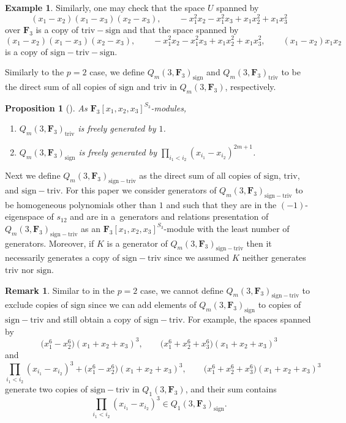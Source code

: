 \documentclass[11pt]{article}
\numberwithin{equation}{section}
\newtheorem{Proposition}[Theorem]{Proposition}
\theoremstyle{definition}
\newtheorem{Example}[Theorem]{Example}
\newtheorem{Remark}[Theorem]{Remark}
\numberwithin{equation}{section}
\newcommand{\F}{\mathbf{F}}
\newcommand{\sgn}{\mathrm{sign}}
\newcommand{\triv}{\mathrm{triv}}
\newcommand{\sign}{\mathrm{sign}}
\newcommand{\six}{\mathrm{sign-triv-sign}}
\newcommand{\siv}{\mathrm{sign-triv}}
\newcommand{\tign}{\mathrm{triv-sign}}
\begin{document}
\begin{Example}
 Similarly, one may check that the space $U$ spanned by
 \[(x_1-x_2)(x_1-x_3)(x_2-x_3),\qquad-x_1^2x_2-x_1^2x_3+x_1x_2^2+x_1x_3^2\]
 over $\mathbf{F}_3$ is a copy of $\tign$ and that the space spanned by
 \[(x_1-x_2)(x_1-x_3)(x_2-x_3),\qquad-x_1^2x_2-x_1^2x_3+x_1x_2^2+x_1x_3^2,\qquad(x_1-x_2)x_1x_2\]
 is a copy of $\six$.
\end{Example}

Similarly to the $p=2$ case, we define $Q_m(3,\mathbf{F}_3)_{\sign}$ and $Q_m(3,\mathbf{F}_3)_{\triv}$ to be the direct sum of all copies of $\sign$ and $\triv$ in $Q_m(3,\mathbf{F}_3)$, respectively.
\begin{Proposition}[\cite{wang2022explicit}]\label{prop:trivsign}
 As $\mathbf{F}_3[x_1,x_2,x_3]^{S_3}$-modules,
 \begin{enumerate}\itemsep=0pt
 \item[$1$.] $Q_m(3,\mathbf{F}_3)_\triv$ is freely generated by $1$.
 \item[$2$.] $Q_m(3,\mathbf{F}_3)_\sgn$ is freely generated by $\prod_{i_1<i_2}(x_{i_1}-x_{i_2})^{2m+1}$.
 \end{enumerate}
\end{Proposition}

Next we define $Q_m(3,\mathbf{F}_3)_{\siv}$ as the direct sum of all copies of $\sign$, $\triv$, and $\siv$. For this paper we consider generators of $Q_m(3,\mathbf{F}_3)_{\siv}$ to be homogeneous polynomials other than $1$ and  such that they are in the $(-1)$-eigenspace of $s_{12}$ and are in a~generators and relations presentation of $Q_m(3,\mathbf{F}_3)_{\siv}$ as an $\mathbf{F}_3[x_1,x_2,x_3]^{S_3}$-module with the least number of generators. Moreover, if $K$ is a generator of $Q_m(3,\mathbf{F}_3)_{\siv}$ then it necessarily generates a copy of $\siv$ since we assumed $K$ neither generates $\triv$ nor $\sign$.

\begin{Remark}
 Similar to in the $p=2$ case, we cannot define $Q_m(3,\mathbf{F}_3)_{\siv}$ to exclude copies of $\sign$ since we can add elements of $Q_m(3,\mathbf{F}_3)_{\sign}$ to copies of $\siv$ and still obtain a copy of $\siv$. For example, the spaces spanned by
 \[\big(x_1^6-x_2^6\big)(x_1+x_2+x_3)^3,\qquad\big(x_1^6+x_2^6+x_3^6\big)(x_1+x_2+x_3)^3\]
 and
 \[\prod_{i_1<i_2}(x_{i_1}-x_{i_2})^{3}+\big(x_1^6-x_2^6\big)(x_1+x_2+x_3)^3,\qquad\big(x_1^6+x_2^6+x_3^6\big)(x_1+x_2+x_3)^3\]
 generate two copies of $\siv$ in $Q_1(3,\F_3)$, and their sum contains
 \[\prod_{i_1<i_2}(x_{i_1}-x_{i_2})^{3}\in Q_1(3,\mathbf{F}_3)_{\sign}.\]
\end{Remark}
\end{document}
